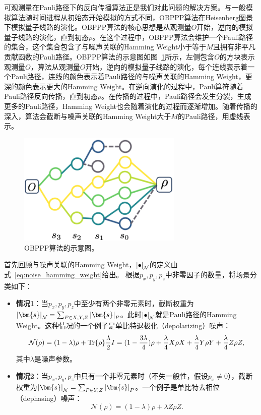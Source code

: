 可观测量在Pauli路径下的反向传播算法正是我们对此问题的解决方案。与一般模拟算法随时间进程从初始态开始模拟的方式不同，OBPPP算法在Heisenberg图景下模拟量子线路的演化。OBPPP算法的核心思想是从观测量$O$开始，逆向的模拟量子线路的演化，直到初态$\rho$。在这个过程中，OBPPP算法会维护一个Pauli路径的集合，这个集合包含了与噪声关联的Hamming Weight小于等于$M$且拥有非平凡贡献函数的Pauli路径。OBPPP算法的示意图如图~\ref{fig:obppp}所示，左侧包含$O$的方块表示观测量$O$，算法从观测量$O$开始，逆向的模拟量子线路的演化，每个连线表示着一个Pauli路径，连线的颜色表示着Pauli路径的与噪声关联的Hamming Weight，更深的颜色表示更大的Hamming Weight。在逆向演化的过程中，Pauli算符随着Pauli路径反向传播，直到初态$\rho$。在传播的过程中，Pauli路径会发生分裂，生成更多的Pauli路径，Hamming Weight也会随着演化的过程而逐渐增加。随着传播的深入，算法会截断与噪声关联的Hamming Weight大于$M$的Pauli路径，用虚线表示。

\begin{figure}[htbp]
    \centering
    \includegraphics[width=0.7\textwidth]{figures/obppp.png}
    \caption{OBPPP算法的示意图。}
    \label{fig:obppp}
\end{figure}

首先回顾与噪声关联的Hamming Weight，$\abs{\bullet}_{\mathcal{N}}$的定义由式~\eqref{eq:noise_hamming_weight}给出。
根据${p_x,p_y,p_z}$中非零因子的数量，将场景分类如下： 
\begin{itemize} 
    \item \textbf{情况1}：当${p_x,p_y,p_z}$中至少有两个非零元素时，截断权重为$\abs{\bm{s}}_{\mathcal{N}}=\sum_{P\in {X,Y,Z}}\abs{\bm{s}}_P$。此时$\abs{\bullet}_{\mathcal{N}}$就是Pauli路径的Hamming Weight。这种情况的一个例子是单比特退极化（depolarizing）噪声：
    \begin{equation}
        \mathcal{N}(\rho) = (1-\lambda)\rho +\Tr{\rho}\frac{\lambda}{2}I=(1-\frac{3\lambda}{4})\rho+\frac{\lambda}{4}X\rho X+\frac{\lambda}{4}Y\rho Y+\frac{\lambda}{4}Z\rho Z,
    \end{equation}
    其中$\lambda$是噪声参数。
    \item \textbf{情况2}：当${p_x,p_y,p_z}$中只有一个非零元素时（不失一般性，假设$p_x\neq 0$），截断权重为$\abs{\bm{s}}_{\mathcal{N}}=\sum_{P\in {Y,Z}}\abs{\bm{s}}_P$。一个例子是单比特去相位（dephasing）噪声：
    \begin{equation}
        \mathcal{N}(\rho) = (1-\lambda)\rho +\lambda Z\rho Z.
    \end{equation}
\end{itemize}



